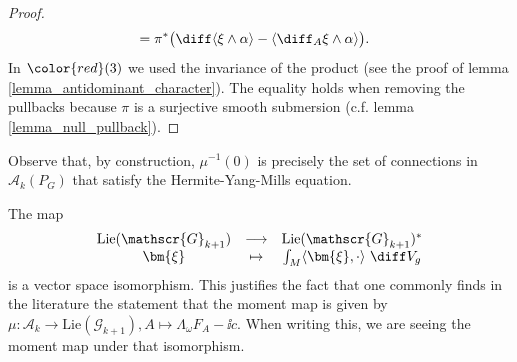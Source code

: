 {\begin{proof}
\begin{align*}
        & = \pi^*\big(\diff \langle \xi \wedge \alpha \rangle -\langle\diff_A \xi \wedge \alpha  \rangle\big).
    \end{align*}
    In \(\color{red}(3)\) we used the invariance of the product (see the proof of lemma \ref{lemma_antidominant_character}). The equality holds when removing the pullbacks because \(\pi\) is a surjective smooth submersion (c.f. lemma \ref{lemma_null_pullback}).
\end{proof}
Observe that, by construction, \(\mu^{-1}(0)\) is precisely the set of connections in \(\mathscr{A}_k(P_G)\) that satisfy the Hermite-Yang-Mills equation.
\begin{obs} \label{obs_mu_lie_sin_dual}
    The map 
    \[
    \begin{array}{ccc}
        \mathrm{Lie}(\mathscr{G}_{k+1}) & \longrightarrow & \mathrm{Lie}(\mathscr{G}_{k+1})^* \\
        \bm{\xi} & \mapsto & \int_M \langle \bm{\xi}, \cdot \rangle \ \diff V_g
    \end{array}
    \]
    is a vector space isomorphism. This justifies the fact that one commonly finds in the literature the statement that the moment map is given by \(\mu \colon \mathscr{A}_{k} \to \mathrm{Lie}(\mathscr{G}_{k+1}), A \mapsto \Lambda_\omega F_A-\ii c\). When writing this, we are seeing the moment map under that isomorphism.
\end{obs}


}
